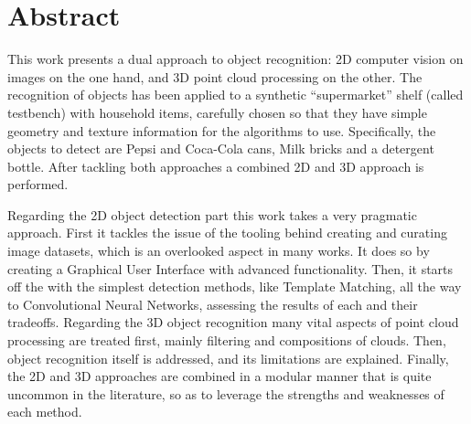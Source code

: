 \documentclass[../main.tex]{subfiles}
\begin{document}
\section{Abstract}
This work presents a dual approach to object recognition: 2D computer vision on images on the one hand, and 3D point cloud processing on the other. The recognition of objects has been applied to a synthetic ``supermarket'' shelf (called testbench) with household items, carefully chosen so that they have simple geometry and texture information for the algorithms to use. Specifically, the objects to detect are Pepsi and Coca-Cola cans, Milk bricks and a detergent bottle. After tackling both approaches a combined 2D and 3D approach is performed.

Regarding the 2D object detection part this work takes a very pragmatic approach. First it tackles the issue of the tooling behind creating and curating image datasets, which is an overlooked aspect in many works. It does so by creating a Graphical User Interface with advanced functionality. Then, it starts off the with the simplest detection methods, like Template Matching, all the way to Convolutional Neural Networks, assessing the results of each and their tradeoffs. Regarding the 3D object recognition many vital aspects of point cloud processing are treated first, mainly filtering and compositions of clouds. Then, object recognition itself is addressed, and its limitations are explained. Finally, the 2D and 3D approaches are combined in a modular manner that is quite uncommon in the literature, so as to leverage the strengths and weaknesses of each method.
\end{document}
